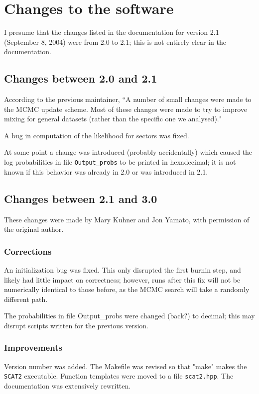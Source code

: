 \documentclass[10pt,titlepage,times,letterpaper]{article}
\def\SCAT{{\tt SCAT2} }
\begin{document}
\section{Changes to the software} 

I presume that the changes listed in the documentation for version 2.1
(September 8, 2004) were from 2.0 to 2.1; this is not entirely clear in
the documentation.

\subsection{Changes between 2.0 and 2.1}

According to the previous maintainer, ``A number of small changes were made to the MCMC update scheme.
Most of these changes were made to try to
improve mixing for general datasets (rather than the specific one we
analysed)."  

A bug in computation of the likelihood for sectors was fixed.

At some point a change was introduced (probably accidentally) which caused the log probabilities
in file {\tt Output\_probs} to be printed in hexadecimal; it is not known
if this behavior was already in 2.0 or was introduced in 2.1.

\subsection{Changes between 2.1 and 3.0}

These changes were made by Mary Kuhner and Jon Yamato, with permission of the
original author.

\subsubsection{Corrections}
An initialization bug was fixed.  This only disrupted
the first burnin step, and likely had little impact on correctness; however,
runs after this fix will not be numerically identical to those before,
as the MCMC search will take a randomly different path.

The probabilities in file Output\_probs were
changed (back?) to decimal; this may disrupt scripts written for the previous
version. 

\subsubsection{Improvements}
Version number was added.  The Makefile was revised so that "make" makes 
the \SCAT executable.  Function templates were moved to a file {\tt scat2.hpp}.
The documentation was extensively rewritten.
\end{document}
